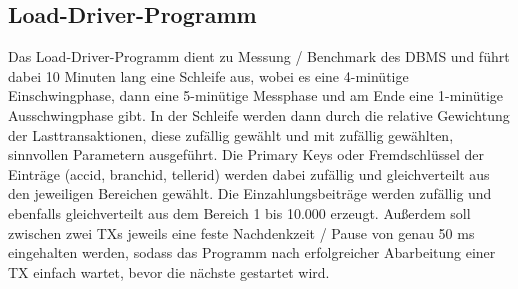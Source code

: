 \subsection{Load-Driver-Programm}\label{subsec:load-driver-programm}
Das Load-Driver-Programm dient zu Messung / Benchmark des DBMS und führt dabei 10 Minuten lang eine Schleife aus, wobei es eine 4-minütige Einschwingphase, dann eine 5-minütige Messphase und am Ende eine 1-minütige Ausschwingphase gibt.
In der Schleife werden dann durch die relative Gewichtung der Lasttransaktionen, diese zufällig gewählt und mit zufällig gewählten, sinnvollen Parametern ausgeführt.
Die Primary Keys oder Fremdschlüssel der Einträge (accid, branchid, tellerid) werden dabei zufällig und gleichverteilt aus den jeweiligen Bereichen gewählt.
Die Einzahlungsbeiträge werden zufällig und ebenfalls gleichverteilt aus dem Bereich 1 bis 10.000 erzeugt.
Außerdem soll  zwischen zwei TXs jeweils eine feste Nachdenkzeit / Pause von genau 50 ms eingehalten werden, sodass das Programm nach erfolgreicher Abarbeitung einer TX einfach wartet, bevor die nächste gestartet wird.